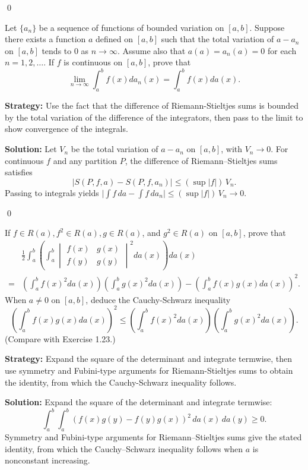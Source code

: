 \qed
\begin{problembox}
Let $\{a_n\}$ be a sequence of functions of bounded variation on $[a, b]$. Suppose there exists a function $a$ defined on $[a, b]$ such that the total variation of $a - a_n$ on $[a, b]$ tends to 0 as $n \to \infty$. Assume also that $a(a) = a_n(a) = 0$ for each $n = 1, 2, \ldots$. If $f$ is continuous on $[a, b]$, prove that
\[\lim_{n \to \infty} \int_a^b f(x) da_n(x) = \int_a^b f(x) da(x).\]
\end{problembox}

\noindent\textbf{Strategy:} Use the fact that the difference of Riemann-Stieltjes sums is bounded by the total variation of the difference of the integrators, then pass to the limit to show convergence of the integrals.

\bigskip\noindent\textbf{Solution:}
Let $V_n$ be the total variation of $a-a_n$ on $[a,b]$, with $V_n\to0$. For continuous $f$ and any partition $P$, the difference of Riemann–Stieltjes sums satisfies
\[|S(P,f,a)-S(P,f,a_n)|\le (\sup|f|)\,V_n.
\]
Passing to integrals yields $\big|\int f\,da-\int f\,da_n\big|\le (\sup|f|)\,V_n\to0$.




\qed
\begin{problembox}
If $f \in R(a), f^2 \in R(a), g \in R(a)$, and $g^2 \in R(a)$ on $[a, b]$, prove that
\begin{align*}
&\frac{1}{2} \int_a^b \left( \int_a^b \begin{vmatrix} f(x) & g(x) \\ f(y) & g(y) \end{vmatrix}^2 da(x) \right) da(x) \\
=& \left( \int_a^b f(x)^2 da(x) \right) \left( \int_a^b g(x)^2 da(x) \right) - \left( \int_a^b f(x)g(x) da(x) \right)^2.
\end{align*}
When $a \neq 0$ on $[a, b]$, deduce the Cauchy-Schwarz inequality
\[\left( \int_a^b f(x)g(x) da(x) \right)^2 \leq \left( \int_a^b f(x)^2 da(x) \right) \left( \int_a^b g(x)^2 da(x) \right).\]
(Compare with Exercise 1.23.)
\end{problembox}

\noindent\textbf{Strategy:} Expand the square of the determinant and integrate termwise, then use symmetry and Fubini-type arguments for Riemann-Stieltjes sums to obtain the identity, from which the Cauchy-Schwarz inequality follows.

\bigskip\noindent\textbf{Solution:}
Expand the square of the determinant and integrate termwise:
\[\int_a^b\int_a^b (f(x)g(y)-f(y)g(x))^2\,da(x)\,da(y)\ge 0.
\]
Symmetry and Fubini-type arguments for Riemann–Stieltjes sums give the stated identity, from which the Cauchy–Schwarz inequality follows when $a$ is nonconstant increasing.




